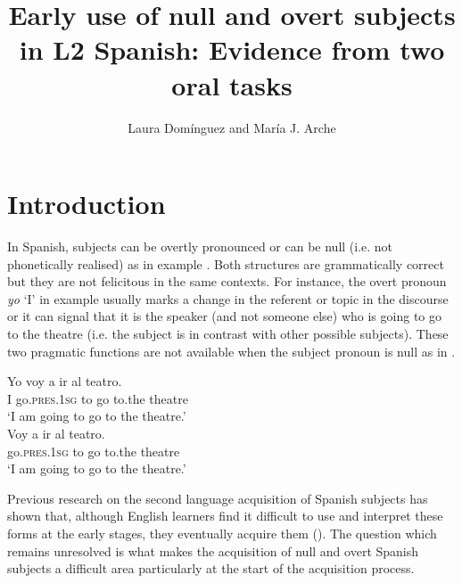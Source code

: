 \documentclass[output=paper]{langscibook}
\author{Laura Domínguez\orcid{}\affiliation{University of Southampton} and María J. Arche\orcid{}\affiliation{University of Greenwich }}
\title[Early use of null and overt subjects in L2 Spanish]
      {Early use of null and overt subjects in L2 Spanish: Evidence from two oral tasks}
\begin{document}
\maketitle

\section{Introduction}

In Spanish, subjects can be overtly pronounced  or can be null (i.e. not phonetically realised) as in example . Both structures are grammatically correct but they are not felicitous in the same contexts. For instance, the overt pronoun \textit{yo} ‘I’ in example  usually marks a change in the referent or topic in the discourse or it can signal that it is the speaker (and not someone else) who is going to go to the theatre (i.e. the subject is in contrast with other possible subjects). These two pragmatic functions are not available when the subject pronoun is null as in .

\ea%
    \label{ex:dominguez:1}
\ea\label{ex:dominguez:1a}
\gll  Yo  voy              a    ir  al          teatro.\\
I      go.\textsc{pres.1sg} to  go to.the theatre\\
\glt ‘I am going to go to the theatre.’\\

\ex\label{ex:dominguez:1b}
\gll Voy     a   ir   al   teatro.\\
   go.\textsc{pres.1sg}    to    go   to.the   theatre\\
\glt ‘I am going to go to the theatre.’
\z
\z

Previous research on the second language acquisition of Spanish subjects has shown that, although English learners find it difficult to use and interpret these forms at the early stages, they eventually acquire them (\citealt{Perez-LerouxGlass1999,LicerasDíaz1999,Lozano2002,Lozano2006,Hertel2003,Montrul2004, MontrulRodríguezLouro2006,BellettiEtAl2007,MargazaBel2006,RothmanIverson2007,Dominguez2013,Pladevall2013,ClementsDomínguez2017}). The question which remains unresolved is what makes the acquisition of null and overt Spanish subjects a difficult area particularly at the start of the acquisition process.
\end{document}
